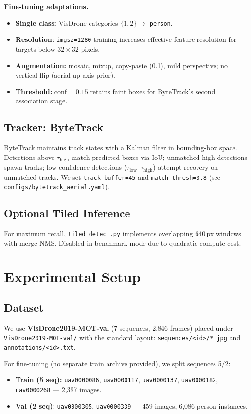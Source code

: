 \documentclass[10pt,twocolumn,letterpaper]{article}
\begin{document}
\textbf{Fine-tuning adaptations.}
\begin{itemize}[leftmargin=*, nosep]
    \item \textbf{Single class:} VisDrone categories $\{1,2\}\rightarrow$ \texttt{person}.
    \item \textbf{Resolution:} \texttt{imgsz=1280} training increases effective feature resolution for targets below $32\times32$ pixels.
    \item \textbf{Augmentation:} mosaic, mixup, copy-paste (0.1), mild perspective; no vertical flip (aerial up-axis prior).
    \item \textbf{Threshold:} $\text{conf}=0.15$ retains faint boxes for ByteTrack's second association stage.
\end{itemize}

\subsection{Tracker: ByteTrack}
ByteTrack maintains track states with a Kalman filter in bounding-box space. Detections above $\tau_{\text{high}}$ match predicted boxes via IoU; unmatched high detections spawn tracks; low-confidence detections ($\tau_{\text{low}}$--$\tau_{\text{high}}$) attempt recovery on unmatched tracks. We set \texttt{track\_buffer=45} and \texttt{match\_thresh=0.8} (see \texttt{configs/bytetrack\_aerial.yaml}).

\subsection{Optional Tiled Inference}
For maximum recall, \texttt{tiled\_detect.py} implements overlapping 640\,px windows with merge-NMS. Disabled in benchmark mode due to quadratic compute cost.

\section{Experimental Setup}
\label{sec:setup}

\subsection{Dataset}
We use \textbf{VisDrone2019-MOT-val} (7 sequences, 2,846 frames) placed under \texttt{VisDrone2019-MOT-val/} with the standard layout: \texttt{sequences/<id>/*.jpg} and \texttt{annotations/<id>.txt}.

For fine-tuning (no separate train archive provided), we split sequences 5/2:
\begin{itemize}[leftmargin=*, nosep]
    \item \textbf{Train (5 seq):} \texttt{uav0000086}, \texttt{uav0000117}, \texttt{uav0000137}, \texttt{uav0000182}, \texttt{uav0000268} --- 2,387 images.
    \item \textbf{Val (2 seq):} \texttt{uav0000305}, \texttt{uav0000339} --- 459 images, 6,086 person instances.
\end{itemize}
\end{document}
